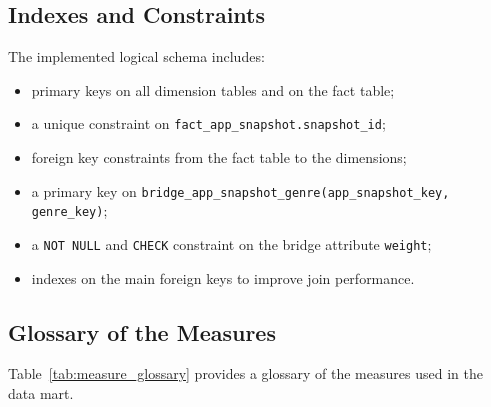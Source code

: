 \documentclass[11pt,a4paper]{article}
\begin{document}
\subsection{Indexes and Constraints}
The implemented logical schema includes:
\begin{itemize}[leftmargin=1.5em]
    \item primary keys on all dimension tables and on the fact table;
    \item a unique constraint on \texttt{fact\_app\_snapshot.snapshot\_id};
    \item foreign key constraints from the fact table to the dimensions;
    \item a primary key on \texttt{bridge\_app\_snapshot\_genre(app\_snapshot\_key, genre\_key)};
    \item a \texttt{NOT NULL} and \texttt{CHECK} constraint on the bridge attribute \texttt{weight};
    \item indexes on the main foreign keys to improve join performance.
\end{itemize}

\subsection{Glossary of the Measures}
Table~\ref{tab:measure_glossary} provides a glossary of the measures used in the data mart.
\end{document}
